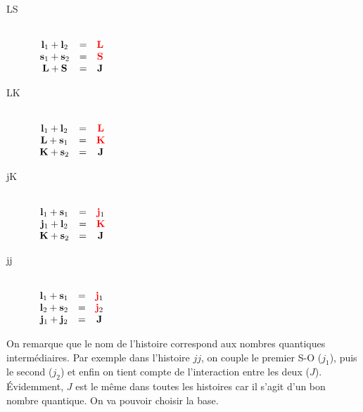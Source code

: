 \begin{multicols}{2}
\begin{description}
\item[LS]\ \\
$\begin{array}{ccc}
{\bf l}_1 +   {\bf  l}_2  & = & {\color{red} {\bf  L}} \\
{\bf s}_1 +   {\bf  s}_2  & = & {\color{red}{\bf  S}} \\
{\bf L} +   {\bf  S}  & = & {\bf  J}
\end{array}$
\item[LK]\ \\ $\begin{array}{ccc}
{\bf l}_1 +   {\bf  l}_2  & = & {\color{red}{\bf  L}} \\
{\bf L} +   {\bf  s}_1  & = & {\color{red}{\bf  K}} \\
{\bf K} +   {\bf  s}_2  & = & {\bf  J}
\end{array}$
\item[jK]\ \\ $\begin{array}{ccc}
{\bf l}_1 +   {\bf  s}_1  & = & {\color{red}{\bf  j}}_1 \\
{\bf j}_1 +   {\bf  l}_2  & = & {\color{red}{\bf  K}} \\
{\bf K} +   {\bf  s}_2  & = & {\bf  J}
\end{array}$
\item[jj]\ \\ $\begin{array}{ccc}
{\bf l}_1 +   {\bf  s}_1  & = & {\color{red}{\bf  j}}_1 \\
{\bf l}_2 +   {\bf  s}_2  & = & {\color{red}{\bf  j}}_2 \\
{\bf j}_1 +   {\bf  j}_2  & = & {\bf  J}
\end{array}$
\end{description}
\end{multicols}
On remarque que le nom de l'histoire correspond aux nombres quantiques
intermédiaires. Par exemple dans l'histoire $jj$, on couple le premier
S-O ($j_1$), puis le second ($j_2$) et enfin on tient compte de l'interaction
entre les deux ($J$). Évidemment, $J$ est le même dans toutes les histoires car
il s'agit d'un bon nombre quantique. On va pouvoir choisir la base.

